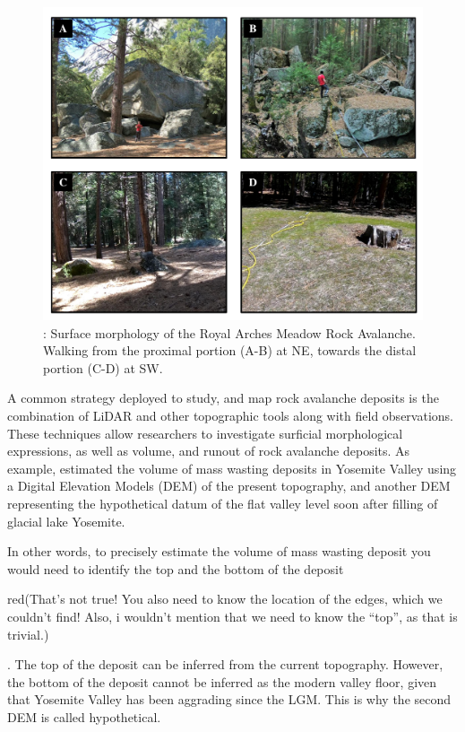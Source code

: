 \documentclass[5p]{elsarticle}
\newcommand{\alon}{\begin{color}{red}}
\newcommand{\aloff}{\end{color}}
\begin{document}
									\begin{figure}[h]

	\includegraphics[width=\textwidth]{Figures/Study_Area2.pdf}
		\caption{: Surface morphology of the Royal Arches Meadow Rock Avalanche. Walking from the proximal portion (A-B) at NE, towards the distal portion (C-D) at SW. \label{Study_Area2}}

									\end{figure}
			
A common strategy deployed to study, and map rock avalanche deposits is the combination of LiDAR and other topographic tools along with field observations. These techniques allow researchers to investigate surficial morphological expressions, as well as volume, and runout of rock avalanche deposits. As example, \cite{Wieczorek+1996} estimated the volume of mass wasting deposits in Yosemite Valley using  a Digital Elevation Models (DEM) of the present topography, and  another DEM representing the hypothetical datum of the flat valley level soon after filling of glacial lake Yosemite. 

In other words, to precisely estimate the volume of mass wasting deposit you would need to identify the top and the bottom of the deposit \alon(That's not true! You also need to know the location of the edges, which we couldn't find! Also, i wouldn't mention that we need to know the ``top'', as that is trivial.)\aloff. The top of the deposit can be inferred from the current topography. However, the bottom of the deposit cannot be inferred as the modern valley floor, given that Yosemite Valley has been aggrading since the LGM. This is why the second DEM is called hypothetical.
\end{document}
